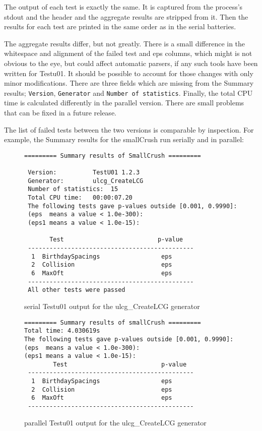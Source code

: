 The output of each test is exactly the same. It is captured from the process's stdout and the header and the aggregate results are stripped from it. Then the results for each test are printed in the same order as in the serial batteries.

The aggregate results differ, but not greatly. There is a small difference in the whitespace and alignment of the failed test and eps columns, which might is not obvious to the eye, but could affect automatic parsers, if any such tools have been written for Testu01. It should be possible to account for those changes with only minor modifications. There are three fields which are missing from the Summary results; \texttt{Version}, \texttt{Generator} and \texttt{Number of statistics}. Finally, the total CPU time is calculated differently in the parallel version. There are small problems that can be fixed in a future release.

The list of failed tests between the two versions is comparable by inspection. For example, the Summary results for the smallCrush run serially and in parallel:

\begin{figure}[h]
\begin{verbatim}
========= Summary results of SmallCrush =========

 Version:          TestU01 1.2.3
 Generator:        ulcg_CreateLCG
 Number of statistics:  15
 Total CPU time:   00:00:07.20
 The following tests gave p-values outside [0.001, 0.9990]:
 (eps  means a value < 1.0e-300):
 (eps1 means a value < 1.0e-15):

       Test                          p-value
 ----------------------------------------------
  1  BirthdaySpacings                 eps
  2  Collision                        eps
  6  MaxOft                           eps
 ----------------------------------------------
 All other tests were passed
\end{verbatim}
\caption{serial Testu01 output for the ulcg\_CreateLCG generator}
  \label{fig:serial-small-output}
\end{figure}

\begin{figure}[h]
  \begin{verbatim}
========= Summary results of smallCrush =========
Total time: 4.030619s
The following tests gave p-values outside [0.001, 0.9990]:
(eps  means a value < 1.0e-300):
(eps1 means a value < 1.0e-15):
        Test                          p-value
 ----------------------------------------------
  1  BirthdaySpacings                 eps
  2  Collision                        eps
  6  MaxOft                           eps
 ----------------------------------------------
  \end{verbatim}
  \caption{parallel Testu01 output for the ulcg\_CreateLCG generator}
  \label{fig:parallel-small-output}
\end{figure}
\clearpage{}

